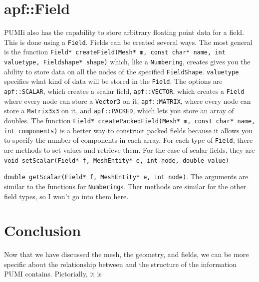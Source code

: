 \documentclass[12pt]{article}
\newcommand{\ttt}{\texttt}
\begin{document}
\section{apf::Field}
PUMIi also has the capability to store arbitrary floating point data for a field.  This is done using a \ttt{Field}.  Fields can be created several ways.  The most general is the function
\newline
\newline
\noindent\ttt{Field* createField(Mesh* m, const char* name, int valuetype, Fieldshape* shape)}
\newline
\newline
\noindent which, like a \ttt{Numbering}, creates gives you the ability to store data on all the nodes of the specified \ttt{FieldShape}.  \ttt{valuetype} specifies what kind of data will be stored in the \ttt{Field}.  The options are \ttt{apf::SCALAR}, which creates a scalar field, \ttt{apf::VECTOR}, which creates a \ttt{Field} where every node can store a \ttt{Vector3} on it, \ttt{apf::MATRIX}, where every node can store a \ttt{Matrix3x3} on it, and \ttt{apf::PACKED}, which lets you store an array of doubles.  The function 
\newline
\newline
\noindent\ttt{Field* createPackedField(Mesh* m, const char* name, int components)}
\newline
\newline
\noindent is a better way to construct packed fields because it allows you to specify the number of components in each array.  For each type of \ttt{Field}, there are methods to set values and retrieve them.  For the case of scalar fields, they are
\newline
\newline
\noindent\ttt{void setScalar(Field* f, MeshEntity* e, int node, double value)}

\noindent\ttt{double getScalar(Field* f, MeshEntity* e, int node)}.
\newline
\newline
\noindent The arguments are similar to the functions for \ttt{Numbering}s.  Ther methods are similar for the other field types, so I won't go into them here.

\section{Conclusion}
Now that we have discussed the mesh, the geometry, and fields, we can be more specific about the relationship between and the structure of the information PUMI contains.  Pictorially, it is
\end{document}
